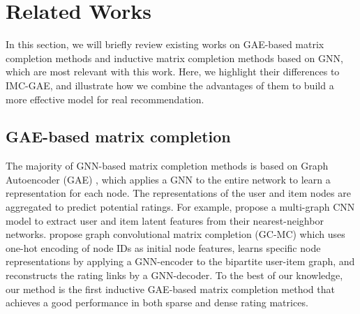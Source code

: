 \documentclass[sigconf]{acmart}
\begin{document}
\vspace{-8pt}
\section{Related Works}
In this section, we will briefly review existing works on GAE-based matrix completion methods and inductive matrix completion methods based on GNN, which are most relevant with this work. Here, we highlight their differences to IMC-GAE, and illustrate how we combine the advantages of them to build a more effective model for real recommendation.

\subsection{GAE-based matrix completion}
The majority of GNN-based matrix completion methods is based on Graph Autoencoder (GAE) \cite{kipf2016variational},  which applies a GNN to the entire network to learn a representation for each node. The representations of the user and item nodes are aggregated to predict potential ratings. For example, \citet{10.5555/3294996.3295127} propose a multi-graph CNN model to extract user and item latent features from their nearest-neighbor networks. \citet{berg2017graph} propose graph convolutional matrix completion (GC-MC) which uses one-hot encoding of node IDs as initial node features, learns specific node representations by applying a GNN-encoder to the bipartite user-item graph, and reconstructs the rating links by a GNN-decoder. To the best of our knowledge, our method is the first inductive GAE-based matrix completion method that achieves a good performance in both sparse and dense rating matrices.    
\end{document}
